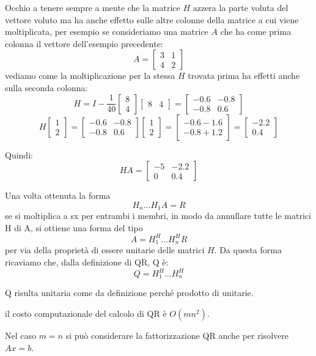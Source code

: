 \documentclass[12pt,a4paper,]{report}
\begin{document}
\begin{nota}
    [Importante]
    Occhio a tenere sempre a mente che la matrice $H$ azzera la parte voluta del vettore voluto ma ha anche effetto sulle altre colonne della matrice a cui viene moltiplicata, per esempio se consideriamo una matrice $A$ che ha come prima colonna il vettore dell'esempio precedente:
    \[
    A = \begin{bmatrix} 3 & 1 \\[-10pt] 4 & 2 \end{bmatrix}
    \]
    vediamo come la moltiplicazione per la stessa $H$ trovata prima ha effetti anche sulla seconda colonna:
    \[
    H = I - \frac{1}{40}\begin{bmatrix}8\\[-10pt]4\end{bmatrix}\begin{bmatrix}8&4\end{bmatrix} = \begin{bmatrix}-0.6&-0.8\\[-10pt]-0.8&0.6\end{bmatrix}
    \]
    \[
    H\begin{bmatrix}1\\[-10pt]2\end{bmatrix} = \begin{bmatrix}-0.6&-0.8\\[-10pt]-0.8&0.6\end{bmatrix}\begin{bmatrix}1\\[-10pt]2\end{bmatrix} = \begin{bmatrix}-0.6-1.6\\[-10pt]-0.8+1.2\end{bmatrix} = \begin{bmatrix}-2.2\\[-10pt]0.4\end{bmatrix}
    \]

    Quindi:
    \[
    HA = \begin{bmatrix}-5 & -2.2 \\[-10pt] 0 & 0.4\end{bmatrix}
    \]
\end{nota}
Una volta ottenuta la forma 
\[
H_n...H_1 A=R
\]
se si moltiplica a sx per entrambi i membri, in modo da annullare tutte le matrici H di A, si ottiene una forma del tipo
\[
A = H^H_1...H^H_n R
\]
per via della proprietà di essere unitarie delle matrici $H$.
Da questa forma ricaviamo che, dalla definizione di QR, Q è:
\[
Q = H^H_1...H^H_n
\]
\begin{nota}
    Q risulta unitaria come da definizione perché prodotto di unitarie.
\end{nota}
\begin{nota}
    [Costo]
    il costo computazionale del calcolo di QR è $O(mn^2)$.
\end{nota}
\begin{nota}
    Nel caso $m=n$ si può considerare la fattorizzazione QR anche per risolvere $Ax=b$.
\end{nota}
\end{document}
